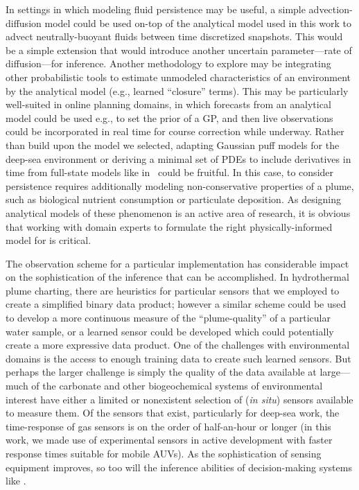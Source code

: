 In settings in which modeling fluid persistence may be useful, a simple advection-diffusion model could be used on-top of the analytical model used in this work to advect neutrally-buoyant fluids between time discretized snapshots. This would be a simple extension that would introduce another uncertain parameter---rate of diffusion---for inference. Another methodology to explore may be integrating other probabilistic tools to estimate unmodeled characteristics of an environment by the analytical model (e.g., learned ``closure'' terms). This may be particularly well-suited in online planning domains, in which forecasts from an analytical model could be used e.g., to set the prior of a GP, and then live observations could be incorporated in real time for course correction while underway. Rather than build upon the model we selected, adapting Gaussian puff models\autocite{ludwig1977simplification} for the deep-sea environment or deriving a minimal set of PDEs to include derivatives in time from full-state models like in~\cite{lavelle2013turbulent} could be fruitful. In this case, to consider persistence requires additionally modeling non-conservative properties of a plume, such as biological nutrient consumption or particulate deposition. As designing analytical models of these phenomenon is an active area of research, it is obvious that working with domain experts to formulate the right physically-informed model for \PHUMES is critical.

The observation scheme for a particular implementation has considerable impact on the sophistication of the inference that can be accomplished. In hydrothermal plume charting, there are heuristics for particular sensors that we employed to create a simplified binary data product; however a similar scheme could be used to develop a more continuous measure of the ``plume-quality'' of a particular water sample, or a learned sensor could be developed which could potentially create a more expressive data product. One of the challenges with environmental domains is the access to enough training data to create such learned sensors. But perhaps the larger challenge is simply the quality of the data available at large---much of the carbonate and other biogeochemical systems of environmental interest have either a limited or nonexistent selection of (\emph{in situ}) sensors available to measure them. Of the sensors that exist, particularly for deep-sea work, the time-response of gas sensors is on the order of half-an-hour or longer (in this work, we made use of experimental sensors in active development with faster response times suitable for mobile AUVs). As the sophistication of sensing equipment improves, so too will the inference abilities of decision-making systems like \PHORTEX. 

